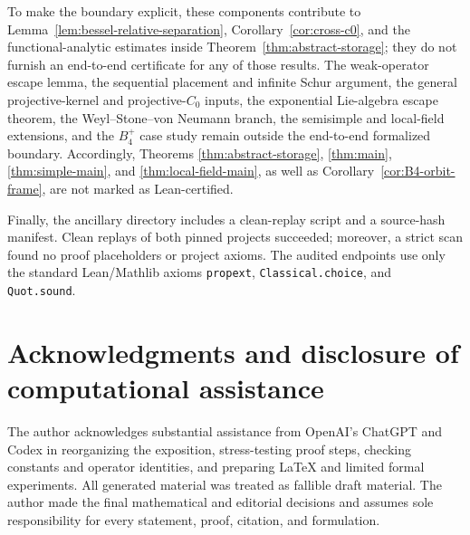\documentclass[reqno]{amsart}
\numberwithin{equation}{section}
\theoremstyle{definition}
\theoremstyle{remark}
\begin{document}
To make the boundary explicit, these components contribute to
Lemma~\ref{lem:bessel-relative-separation},
Corollary~\ref{cor:cross-c0}, and the functional-analytic estimates inside
Theorem~\ref{thm:abstract-storage}; they do not furnish an end-to-end
certificate for any of those results.  The weak-operator escape lemma, the
sequential placement and infinite Schur argument, the general
projective-kernel and projective-$C_0$ inputs, the exponential Lie-algebra
escape theorem, the Weyl--Stone--von Neumann branch, the semisimple and
local-field extensions, and the $B_4^+$ case study remain outside the
end-to-end formalized boundary.  Accordingly, Theorems
\ref{thm:abstract-storage}, \ref{thm:main}, \ref{thm:simple-main}, and
\ref{thm:local-field-main}, as well as Corollary~\ref{cor:B4-orbit-frame},
are not marked as Lean-certified.

Finally, the ancillary directory includes a clean-replay script and a
source-hash manifest.  Clean replays of both pinned projects succeeded;
moreover, a strict scan found no proof placeholders or project axioms.  The audited
endpoints use only the standard
Lean/Mathlib axioms \texttt{propext}, \texttt{Classical.choice}, and
\texttt{Quot.sound}.

\section*{Acknowledgments and disclosure of computational assistance}

The author acknowledges substantial assistance from OpenAI's ChatGPT and
Codex in reorganizing the exposition, stress-testing proof steps, checking
constants and operator identities, and preparing \LaTeX{} and limited formal
experiments.  All generated material was treated as fallible draft material.
The author made the final mathematical and editorial decisions and assumes
sole responsibility for every statement, proof, citation, and formulation.
\end{document}
